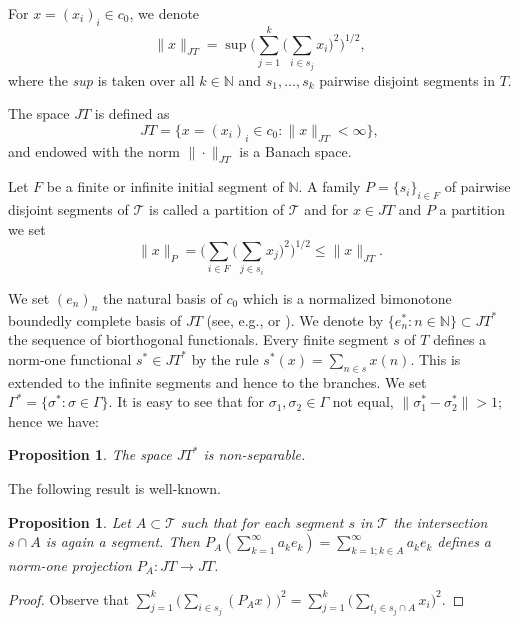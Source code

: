\documentclass[12pt]{amsart}
\theoremstyle{plain}
\numberwithin{equation}{section}
\newcommand{\N}{\mathbb{N}}
\newcommand{\Tree}{\mathcal{T}}
\newtheorem{proposition}[theorem]{Proposition}
\begin{document}
For $x=(x_i)_i \in c_0$, we denote
\begin{equation}\label{JT-norm}
\|x\|_{JT}= \sup \Big(\sum_{j=1}^k \big(\sum_{i\in s_j} x_{i}\big)^2 \Big)^{1/2},
\end{equation}
where the \emph{sup} is taken over all $k\in\N$ and $s_1,\ldots, s_k$ pairwise disjoint segments in $T$.

The space $JT$ is defined as
$$
JT=\{x=(x_i)_i\in c_0: \|x\|_{JT}< \infty \},
$$
and endowed with the norm $\|\cdot\|_{JT}$ is a Banach space.

Let $F$ be a finite or infinite initial segment of $\N$. A family $P=\{s_i\} _{i\in F}$  of pairwise disjoint segments of  $\mathcal{T}$ is called a partition of $\mathcal{T}$ and for $x\in JT$   and $P$ a partition  we set
\begin{equation}\label{JT-P}
\|x\|_{P}= \Big(\sum_{i\in F} \big(\sum_{j\in s_i} x_{j}\big)^2 \Big)^{1/2} \le \|x\|_{JT}.
\end{equation}


We set $(e_n)_n$ the natural basis of $c_0$ which is a normalized bimonotone boundedly complete basis of $JT$ (see, e.g., \cite[page 419]{AI} or \cite[page 10]{andrew}).
We denote by $\{e^*_n : n \in \N\}\subset JT^*$ the sequence of biorthogonal functionals.
Every finite segment $s$ of $T$ defines a norm-one functional $s^* \in JT^*$ by the rule $s^*(x) = \sum_{n\in s}x(n)$. This is extended to the infinite segments and hence to the branches. We set $\Gamma^* = \{ \sigma^* : \sigma \in \Gamma \}$. It is easy to see that for $\sigma_1,\sigma_2 \in \Gamma$ not equal, $\|\sigma_1^* - \sigma_2^*\| > 1$; hence we have:

\begin{proposition}
The space $JT^*$ is non-separable.
\end{proposition}

The following result is well-known.

\begin{proposition}\label{P_A}
Let $A\subset \Tree$ such that for each segment $s$ in $\Tree$ the intersection $s\cap A$ is again a segment. Then $P_A(\sum_{k=1}^\infty a_k e_{k}) = \sum_{k=1; k\in A}^\infty a_k e_{k}$ defines a norm-one projection $P_A:JT\to JT$.
\end{proposition}
\begin{proof}
Observe that $\sum_{j=1}^k \big(\sum_{i\in s_j} (P_Ax)_{}\big)^2 = \sum_{j=1}^k \big(\sum_{t_i\in s_j\cap A} x_{i}\big)^2$.
\end{proof}
\end{document}
